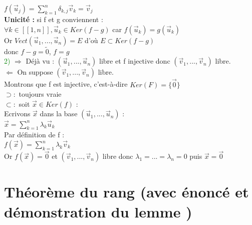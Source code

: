 \documentclass{article}
\begin{document}
$f(\vec u_j)=\sum_{k=1}^n \delta_{k,j} \vec v_k = \vec v_j$ \\
{\bf Unicité :} si f et g conviennent : \\
$\forall k \in [[1,n]], \vec u_k \in Ker(f-g)$ car $f(\vec u_k)=g(\vec u_k)$ \\
Or $Vect(\vec u_1,..., \vec u_n)=E$ d'où $E \subset Ker(f-g)$  \\
donc $f-g=\tilde{0}$, $f=g$ \\
\textcolor{green}{2)} $\Rightarrow$  Déjà vu : $(\vec u_1,..., \vec u_n)$ libre et f injective donc $(\vec v_1,...,\vec v_n)$ libre. \\
$\Leftarrow$ On suppose $(\vec v_1,..., \vec v_n)$ libre. \\
Montrons que f est injective, c'est-à-dire $Ker(F)=\lbrace \vec 0 \rbrace$ \\
$\supset :$ toujours vraie \\
$\subset :$ soit $\vec x \in Ker(f)$ : \\
Ecrivons $\vec x$ dans la base $(\vec u_1,...,\vec u_n)$ : \\
$\vec x=\sum_{k=1}^n \lambda_k \vec u_k$ \\
Par définition de f : \\
$f(\vec x)= \sum_{k=1}^n \lambda_k \vec v_k$ \\
Or $f(\vec x) = \vec 0$ et $(\vec v_1,..., \vec v_n)$ libre donc $\lambda_1=...= \lambda_n=0$ puis $\vec x= \vec 0$
\section{Théorème du rang (avec énoncé et démonstration du lemme )}
\end{document}
